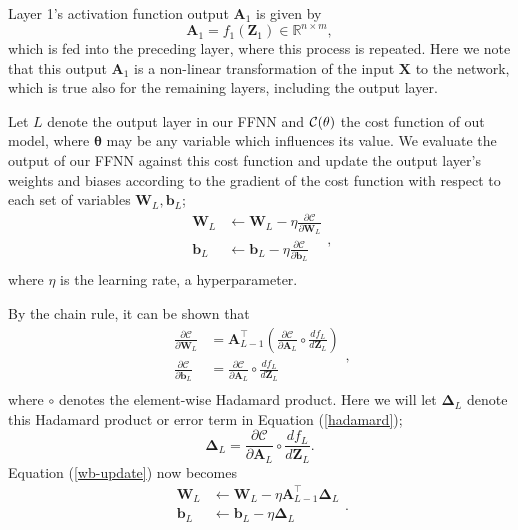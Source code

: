 \documentclass[]{article}
\begin{document}
Layer 1's activation function output $\mathbf{A}_1$ is given by
\begin{equation} \label{outputs}
	\mathbf{A}_1 = f_1(\mathbf{Z}_1) \in \mathbb{R}^{n \times m},
\end{equation}
which is fed into the preceding layer, where this process is repeated. Here we note that this output $\mathbf{A}_1$ is a non-linear transformation of the input $\mathbf{X}$ to the network, which is true also for the remaining layers, including the output layer.

\vspace{5mm}

Let $L$ denote the output layer in our FFNN and $\cal{C}(\mathbf{\theta})$ the cost function of out model, where $\mathbf{\theta}$ may be any variable which influences its value. We evaluate the output of our FFNN against this cost function and update the output layer's weights and biases according to the gradient of the cost function with respect to each set of variables $\mathbf{W}_L, \mathbf{b}_L$;
\begin{equation} \label{wb-update}
\begin{aligned}
		\mathbf{W}_L &\leftarrow \mathbf{W}_L - \eta \frac{\partial \mathcal{C}}{\partial \mathbf{W}_L} \\
		\mathbf{b}_L &\leftarrow \mathbf{b}_L - \eta \frac{\partial \mathcal{C}}{\partial \mathbf{b}_L} \\
\end{aligned},
\end{equation}
where $\eta$ is the learning rate, a hyperparameter.

By the chain rule, it can be shown that
\begin{equation} \label{hadamard}
\begin{aligned}
	\frac{\partial \mathcal{C}}{\partial \mathbf{W}_L} &= 
	\mathbf{A}_{L-1}^\intercal \left(\frac{\partial \mathcal{C}}{\partial \mathbf{A}_L} \circ \frac{df_L}{d\mathbf{Z}_L} \right) \\
	\frac{\partial \mathcal{C}}{\partial \mathbf{b}_L} &= 
	\frac{\partial \mathcal{C}}{\partial \mathbf{A}_L} \circ \frac{df_L}{d\mathbf{Z}_L} \\
\end{aligned},
\end{equation}
where $\circ$ denotes the element-wise Hadamard product. Here we will let $\mathbf{\Delta}_L$ denote this Hadamard product or error term in Equation (\ref{hadamard});
\begin{equation} \label{delta-L}
	\mathbf{\Delta}_L = \frac{\partial \mathcal{C}}{\partial \mathbf{A}_L} \circ \frac{df_L}{d\mathbf{Z}_L}.
\end{equation}
Equation (\ref{wb-update}) now becomes
\begin{equation}
\begin{aligned}
	\mathbf{W}_L &\leftarrow \mathbf{W}_L - \eta \mathbf{A}_{L-1}^\intercal \mathbf{\Delta}_L \\
	\mathbf{b}_L &\leftarrow \mathbf{b}_L - \eta \mathbf{\Delta}_L \\
\end{aligned}.
\end{equation}
\end{document}

